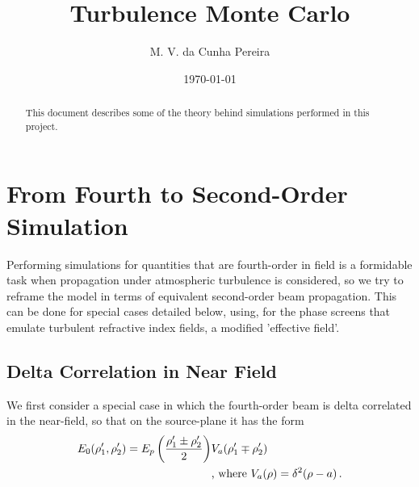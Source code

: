 \documentclass[12pt]{article}
\title{Turbulence Monte Carlo}
\author{M. V. da Cunha Pereira}
\date{\today}
\begin{document}
  \maketitle 
\begin{abstract}
This document describes some of the theory behind simulations performed in this project.
\end{abstract}

\section{From Fourth to Second-Order Simulation}
Performing simulations for quantities that are fourth-order in field is a formidable task when propagation under atmospheric turbulence is considered, so we try to reframe the model in terms of equivalent second-order beam propagation. This can be done for special cases detailed below, using, for the phase screens that emulate turbulent refractive index fields, a modified 'effective field'.

\subsection{Delta Correlation in Near Field}
We first consider a special case in which the fourth-order beam is delta correlated in the near-field, so that on the source-plane it has the form
\begin{align}
E_0(\rho_1^\prime, \rho_2^\prime) = E_p\left(\frac{\rho_1^\prime\pm \rho_2^\prime}{2}\right) &V_a(\rho_1^\prime\mp \rho_2^\prime) \hspace{1cm} \\
&\mbox{, where } V_a(\rho) = \delta^2(\rho-a) \, . \notag
\end{align}
\end{document}
